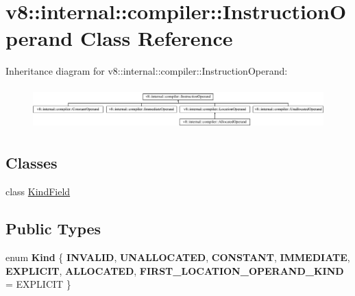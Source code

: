 \hypertarget{classv8_1_1internal_1_1compiler_1_1InstructionOperand}{}\section{v8\+:\+:internal\+:\+:compiler\+:\+:Instruction\+Operand Class Reference}
\label{classv8_1_1internal_1_1compiler_1_1InstructionOperand}
Inheritance diagram for v8\+:\+:internal\+:\+:compiler\+:\+:Instruction\+Operand\+:\begin{figure}[H]
\begin{center}
\leavevmode
\includegraphics[height=1.627907cm]{classv8_1_1internal_1_1compiler_1_1InstructionOperand}
\end{center}
\end{figure}
\subsection*{Classes}
\begin{DoxyCompactItemize}
\item 
class \mbox{\hyperlink{classv8_1_1internal_1_1compiler_1_1InstructionOperand_1_1KindField}{Kind\+Field}}
\end{DoxyCompactItemize}
\subsection*{Public Types}
\begin{DoxyCompactItemize}
\item 
\mbox{\label{classv8_1_1internal_1_1compiler_1_1InstructionOperand_a8dfff4775cf07d442bb9e07ba81c4dcf}} 
enum {\bfseries Kind} \{ \newline
{\bfseries I\+N\+V\+A\+L\+ID}, 
{\bfseries U\+N\+A\+L\+L\+O\+C\+A\+T\+ED}, 
{\bfseries C\+O\+N\+S\+T\+A\+NT}, 
{\bfseries I\+M\+M\+E\+D\+I\+A\+TE}, 
\newline
{\bfseries E\+X\+P\+L\+I\+C\+IT}, 
{\bfseries A\+L\+L\+O\+C\+A\+T\+ED}, 
{\bfseries F\+I\+R\+S\+T\+\_\+\+L\+O\+C\+A\+T\+I\+O\+N\+\_\+\+O\+P\+E\+R\+A\+N\+D\+\_\+\+K\+I\+ND} = E\+X\+P\+L\+I\+C\+IT
 \}
\end{DoxyCompactItemize}
